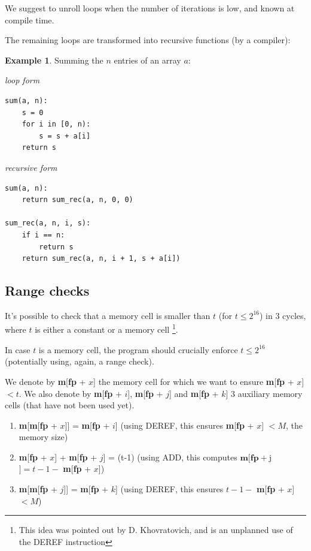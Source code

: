 \documentclass{article}
\theoremstyle{definition}
\newtheorem{exmp}{Example}[section]
\begin{document}
We suggest to unroll loops when the number of iterations is low, and known at compile time.

The remaining loops are transformed into recursive functions (by a compiler):

\begin{exmp}
Summing the $n$ entries of an array $a$:

\begin{center}
\begin{minipage}[t]{0.46\textwidth}
\centering\textit{loop form}
\begin{verbatim}
sum(a, n):
    s = 0
    for i in [0, n):
        s = s + a[i]
    return s
\end{verbatim}
\end{minipage}
\hfill
\begin{minipage}[t]{0.46\textwidth}
\centering\textit{recursive form}
\begin{verbatim}
sum(a, n):
    return sum_rec(a, n, 0, 0)

sum_rec(a, n, i, s):
    if i == n:
        return s
    return sum_rec(a, n, i + 1, s + a[i])
\end{verbatim}
\end{minipage}
\end{center}

\end{exmp}

\subsection{Range checks}\label{sec:range-checks}

It's possible to check that a memory cell is smaller than $t$ (for $t \leq 2^{16}$) in 3 cycles, where $t$ is either a constant or a memory cell \footnote{This idea was pointed out by D. Khovratovich, and is an unplanned use of the DEREF instruction}.

In case $t$ is a memory cell, the program should crucially enforce $t \leq 2^{16}$ (potentially using, again, a range check).

We denote by \textbf{m}[\textbf{fp} + $x$] the memory cell for which we want to ensure \textbf{m}[\textbf{fp} + $x$] $< t$.
We also denote by \textbf{m}[\textbf{fp} + $i$], \textbf{m}[\textbf{fp} + $j$] and \textbf{m}[\textbf{fp} + $k$] 3 auxiliary memory cells (that have not been used yet).
\begin{enumerate}
    \item \textbf{m}[\textbf{m}[\textbf{fp} + $x$]] = \textbf{m}[\textbf{fp} + $i$] (using DEREF, this ensures \textbf{m}[\textbf{fp} + $x$] $ < M$, the memory size)
    \item \textbf{m}[\textbf{fp} + $x$] + \textbf{m}[\textbf{fp} + $j$] = (t-1) (using ADD, this computes $\textbf{m}[\textbf{fp} + $j$] = t - 1 - $ \textbf{m}[\textbf{fp} + $x$])
        \item \textbf{m}[\textbf{m}[\textbf{fp} + $j$]] = \textbf{m}[\textbf{fp} + $k$] (using DEREF, this ensures $t - 1 - $ \textbf{m}[\textbf{fp} + $x$] $ < M$)
\end{enumerate}
\end{document}
